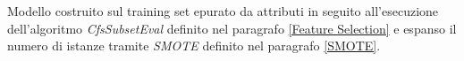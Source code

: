 Modello costruito sul training set epurato da attributi in seguito all'esecuzione dell'algoritmo \textit{CfsSubsetEval} definito nel paragrafo \ref{Feature Selection} e espanso il numero di istanze tramite \textit{SMOTE} definito nel paragrafo \ref{SMOTE}.

%
%
%
%
%
%
%
